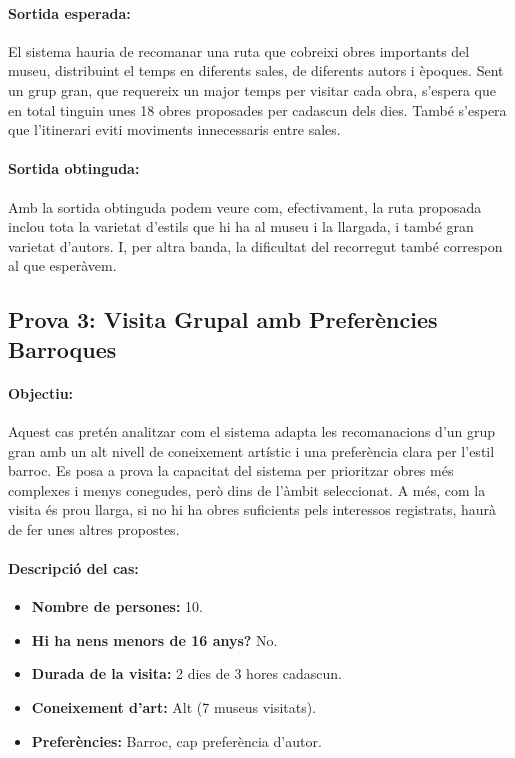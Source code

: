 \documentclass[a4paper]{article}
\begin{document}
	\paragraph{Sortida esperada:}
	El sistema hauria de recomanar una ruta que cobreixi obres importants del museu, distribuint el temps en diferents sales, de diferents autors i èpoques. Sent un grup gran, que requereix un major temps per visitar cada obra, s'espera que en total tinguin unes 18 obres proposades per cadascun dels dies. També s’espera que l’itinerari eviti moviments innecessaris entre sales.
	
	\paragraph{Sortida obtinguda:} 
	Amb la sortida obtinguda podem veure com, efectivament, la ruta proposada inclou tota la varietat d'estils que hi ha al museu i la llargada, i també gran varietat d'autors. I, per altra banda, la dificultat del recorregut també correspon al que esperàvem.
	
	
	\subsection{Prova 3: Visita Grupal amb Preferències Barroques}
	
	\paragraph{Objectiu:} 
	Aquest cas pretén analitzar com el sistema adapta les recomanacions d'un grup gran amb un alt nivell de coneixement artístic i una preferència clara per l’estil barroc. Es posa a prova la capacitat del sistema per prioritzar obres més complexes i menys conegudes, però dins de l’àmbit seleccionat. A més, com la visita és prou llarga, si no hi ha obres suficients pels interessos registrats, haurà de fer unes altres propostes.
	
	\paragraph{Descripció del cas:} 
	
	\begin{itemize}
		\item \textbf{Nombre de persones:} 10.
		\item \textbf{Hi ha nens menors de 16 anys?} No.
		\item \textbf{Durada de la visita:} 2 dies de 3 hores cadascun.
		\item \textbf{Coneixement d’art:} Alt (7 museus visitats).
		\item \textbf{Preferències:} Barroc, cap preferència d'autor.
	\end{itemize}
	
\end{document}
